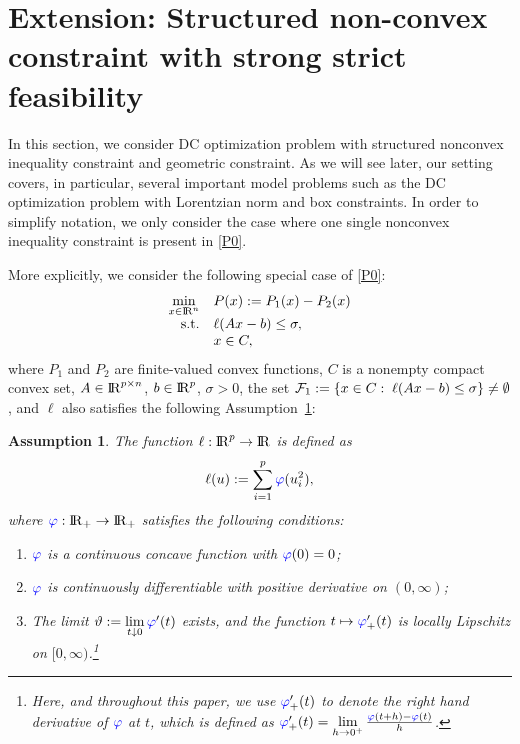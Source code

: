 \documentclass[10pt]{article}
\numberwithin{equation}{section}
\newtheorem{assumption}{Assumption}[section]
\def\R{{\rm I\!R}}
\begin{document}
\section{Extension: Structured non-convex constraint with strong strict feasibility}\label{sec4}

In this section, we consider DC optimization problem with structured nonconvex inequality constraint and geometric constraint. As we will see later, our setting covers, in particular, several important model problems such as the DC optimization problem with Lorentzian norm and box constraints. In order to simplify notation, we only consider the case where one single nonconvex inequality constraint is present in \eqref{P0}.

More explicitly, we consider the following special case of \eqref{P0}:
\begin{equation}\label{P1}
  \begin{array}{rl}
\min\limits_{x\in\R^n} & P(x) := P_1(x) - P_2(x)\\
{\rm s.t.} & \ell(Ax - b)\leq \sigma,\\
           & x\in C,
  \end{array}
\end{equation}
where $P_1$ and $P_2$ are {\color{blue}finite-valued convex} functions, $C$ is a nonempty compact convex set, $A\in\R^{p\times n}$, $b\in\R^p$,  $\sigma >0$, the set ${\cal F}_1:= \{x\in C:\; \ell(Ax - b)\le \sigma\}\neq \emptyset$, and $\ell$ also satisfies the following Assumption~\ref{gassum}:
\begin{assumption}\label{gassum}
The function $\ell:\R^p\to \R$ is defined as
\[
\ell(u):= \sum_{i=1}^{p} {\color{blue} \varphi}(u_i^2),
\]
where ${\color{blue} \varphi}:\R_+\rightarrow \R_+$ satisfies the following conditions:
\begin{enumerate}[{\rm (i)}]
  \item ${\color{blue} \varphi}$ is a continuous concave function with ${\color{blue} \varphi}(0) = 0$;
  \item ${\color{blue} \varphi}$ is continuously differentiable with positive derivative on $(0, \infty)$;
  \item The limit $\vartheta:= \lim\limits_{t\downarrow 0}{\color{blue} \varphi}'(t)$ exists, and the function $t\mapsto {\color{blue} \varphi}'_+(t)$ is locally Lipschitz on $[0,\infty)$.\footnote{Here, and throughout this paper, we use ${\color{blue} \varphi}'_+(t)$ to denote the right hand derivative of ${\color{blue} \varphi}$ at $t$, which is defined as ${\color{blue} \varphi}'_+(t)=\lim\limits_{h \rightarrow 0^+}\frac{{\color{blue} \varphi}(t+h)-{\color{blue} \varphi}(t)}{h}$.}
\end{enumerate}
\end{assumption}
\end{document}
